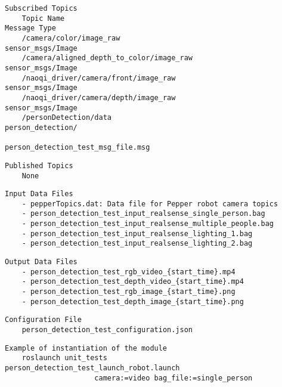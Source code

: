 \documentclass{CSSRforAfrica}
\newcommand{\checkboxChecked}{\fbox{\ding{51}}} %
\begin{document}
\begin{description}
\item[\checkboxChecked] 
 {\small 
\begin{verbatim}
Subscribed Topics
    Topic Name                                              Message Type
    /camera/color/image_raw                                 sensor_msgs/Image             
    /camera/aligned_depth_to_color/image_raw                sensor_msgs/Image
    /naoqi_driver/camera/front/image_raw                    sensor_msgs/Image
    /naoqi_driver/camera/depth/image_raw                    sensor_msgs/Image
    /personDetection/data                                   person_detection/
                                          person_detection_test_msg_file.msg
\end{verbatim}}

\item[\checkboxChecked] 
 {\small 
\begin{verbatim}
Published Topics
    None
\end{verbatim}}

\item[\checkboxChecked] 
 {\small 
\begin{verbatim}
Input Data Files
    - pepperTopics.dat: Data file for Pepper robot camera topics
    - person_detection_test_input_realsense_single_person.bag
    - person_detection_test_input_realsense_multiple_people.bag
    - person_detection_test_input_realsense_lighting_1.bag
    - person_detection_test_input_realsense_lighting_2.bag
\end{verbatim}}

\item[\checkboxChecked] 
 {\small 
\begin{verbatim}
Output Data Files
    - person_detection_test_rgb_video_{start_time}.mp4
    - person_detection_test_depth_video_{start_time}.mp4
    - person_detection_test_rgb_image_{start_time}.png
    - person_detection_test_depth_image_{start_time}.png
\end{verbatim}}

\item[\checkboxChecked] 
 {\small 
\begin{verbatim}
Configuration File
    person_detection_test_configuration.json
\end{verbatim}}

\item[\checkboxChecked] 
 {\small 
\begin{verbatim}Example of instantiation of the module
    roslaunch unit_tests person_detection_test_launch_robot.launch 
                     camera:=video bag_file:=single_person


\end{verbatim}}
\end{description}
\end{document}
